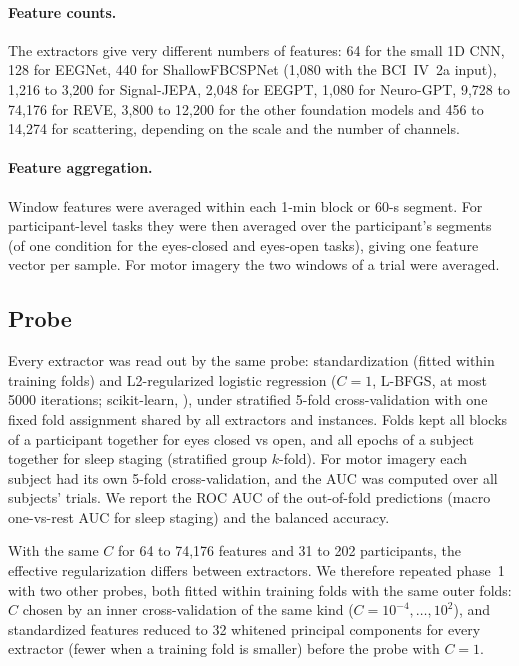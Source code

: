 \documentclass[11pt]{article}
\begin{document}
\paragraph{Feature counts.} The extractors give very different numbers of features: 64 for the
small 1D CNN, 128 for EEGNet, 440 for ShallowFBCSPNet (1,080 with the BCI~IV~2a input), 1,216 to
3,200 for Signal-JEPA, 2,048 for EEGPT, 1,080 for Neuro-GPT, 9,728 to 74,176 for REVE, 3,800 to 12,200 for the other
foundation models and 456 to 14,274 for scattering, depending on the scale and the number of channels.

\paragraph{Feature aggregation.} Window features were averaged within each 1-min block or 60-s
segment. For participant-level tasks they were then averaged over the participant's segments
(of one condition for the eyes-closed and eyes-open tasks), giving one feature vector per sample.
For motor imagery the two windows of a trial were averaged.

\subsection{Probe}
Every extractor was read out by the same probe: standardization (fitted within training folds)
and L2-regularized logistic regression ($C = 1$, L-BFGS, at most 5000 iterations;
scikit-learn, \citealp{pedregosa2011}), under stratified 5-fold cross-validation with one fixed
fold assignment shared by all extractors and instances. Folds kept all blocks of a participant
together for eyes closed vs open, and all epochs of a subject together for sleep staging
(stratified group $k$-fold). For motor imagery each subject had its own 5-fold cross-validation,
and the AUC was computed over all subjects' trials. We report the ROC AUC of the out-of-fold
predictions (macro one-vs-rest AUC for sleep staging) and the balanced accuracy.

With the same $C$ for 64 to 74,176 features and 31 to 202 participants, the effective
regularization differs between extractors. We therefore repeated phase~1 with two other probes,
both fitted within training folds with the same outer folds: $C$ chosen by an inner
cross-validation of the same kind ($C = 10^{-4}, \dots, 10^{2}$), and standardized features reduced
to 32 whitened principal components for every extractor (fewer when a training fold is smaller)
before the probe with $C = 1$.
\end{document}

